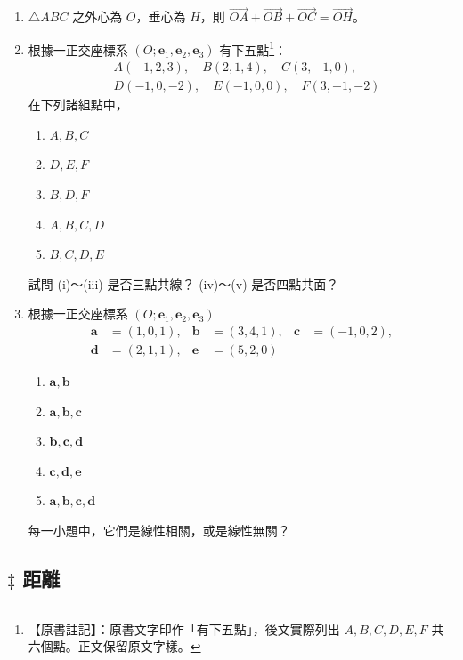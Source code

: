 \begin{enumerate}[leftmargin=2em]
  \item $\triangle ABC$ 之外心為 $O$，垂心為 $H$，則 $\vec{OA} + \vec{OB} + \vec{OC} = \vec{OH}$。
  \item[\textbf{*3.}] 根據一正交座標系 $(O; \mathbf{e}_1, \mathbf{e}_2, \mathbf{e}_3)$ 有下五點\label{note:b3-ch5-p231-ex3-points}\footnote{【原書註記】：原書文字印作「有下五點」，後文實際列出 $A, B, C, D, E, F$ 共六個點。正文保留原文字樣。}：
  \begin{align*}
  &A(-1, 2, 3),\quad B(2, 1, 4),\quad C(3, -1, 0), \\
  &D(-1, 0, -2),\quad E(-1, 0, 0),\quad F(3, -1, -2)
  \end{align*}
  在下列諸組點中，
  \begin{enumerate}[label=(\roman*), leftmargin=2.5em]
    \item $A, B, C$
    \item $D, E, F$
    \item $B, D, F$
    \item $A, B, C, D$
    \item $B, C, D, E$
  \end{enumerate}
  試問 (i)～(iii) 是否三點共線？ (iv)～(v) 是否四點共面？
  \item[\textbf{*4.}] 根據一正交座標系 $(O; \mathbf{e}_1, \mathbf{e}_2, \mathbf{e}_3)$
  \begin{align*}
  \mathbf{a} &= (1, 0, 1), & \mathbf{b} &= (3, 4, 1), & \mathbf{c} &= (-1, 0, 2), \\
  \mathbf{d} &= (2, 1, 1), & \mathbf{e} &= (5, 2, 0)
  \end{align*}
  \begin{enumerate}[label=(\roman*), leftmargin=2.5em]
    \item $\mathbf{a}, \mathbf{b}$
    \item $\mathbf{a}, \mathbf{b}, \mathbf{c}$
    \item $\mathbf{b}, \mathbf{c}, \mathbf{d}$
    \item $\mathbf{c}, \mathbf{d}, \mathbf{e}$
    \item $\mathbf{a}, \mathbf{b}, \mathbf{c}, \mathbf{d}$
  \end{enumerate}
  每一小題中，它們是線性相關，或是線性無關？
\end{enumerate}

\subsection{\texorpdfstring{$\ddagger$ }{‡ }距離}\label{sec:b3-5-2}

